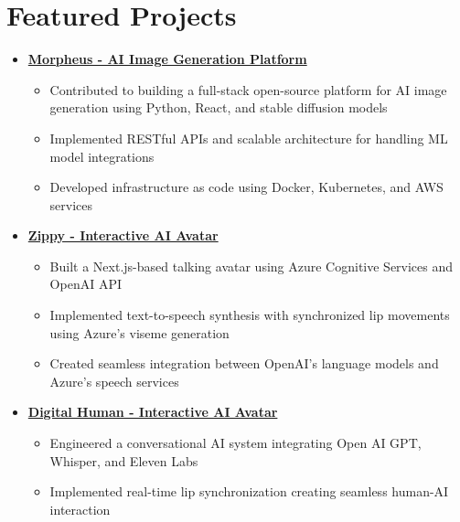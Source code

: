 \documentclass[letterpaper,11pt]{article}
\begin{document}
\section{Featured Projects}
\begin{itemize}[leftmargin=*]
    \item \textbf{\href{https://github.com/Monadical-SAS/Morpheus}{Morpheus - AI Image Generation Platform \faExternalLink}}
    \begin{itemize}
        \item Contributed to building a full-stack open-source platform for AI image generation using Python, React, and stable diffusion models
        \item Implemented RESTful APIs and scalable architecture for handling ML model integrations
        \item Developed infrastructure as code using Docker, Kubernetes, and AWS services
    \end{itemize}
    
    \item \textbf{\href{https://github.com/asanchezyali/ai-avatar}{Zippy - Interactive AI Avatar \faExternalLink}}
    \begin{itemize}
        \item Built a Next.js-based talking avatar using Azure Cognitive Services and OpenAI API
        \item Implemented text-to-speech synthesis with synchronized lip movements using Azure's viseme generation
        \item Created seamless integration between OpenAI's language models and Azure's speech services
    \end{itemize}

    \item \textbf{\href{https://github.com/asanchezyali/talking-avatar-with-ai}{Digital Human - Interactive AI Avatar \faExternalLink}}
    \begin{itemize}
        \item Engineered a conversational AI system integrating Open AI GPT, Whisper, and Eleven Labs
        \item Implemented real-time lip synchronization creating seamless human-AI interaction
    \end{itemize}
\end{itemize}
\end{document}
